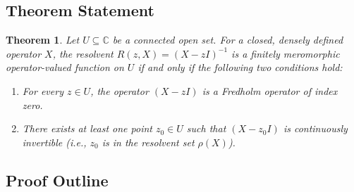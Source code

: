 \documentclass[JHEP,12pt]{article}
\newtheorem{theorem}[lemma]{Theorem}
\begin{document}
\subsection{Theorem Statement}\label{thmFredholm}
\begin{theorem}
Let $U \subseteq \mathbb{C}$ be a connected open set. For a closed, densely defined operator $X$, the resolvent $R(z, X) = (X - zI)^{-1}$ is a finitely meromorphic operator-valued function on $U$ if and only if the following two conditions hold:
\begin{enumerate}
    \item For every $z \in U$, the operator $(X - zI)$ is a Fredholm operator of index zero.
    \item There exists at least one point $z_0 \in U$ such that $(X - z_0I)$ is continuously invertible (i.e., $z_0$ is in the resolvent set $\rho(X)$).
\end{enumerate}
\end{theorem}

\subsection{Proof Outline}
\end{document}

